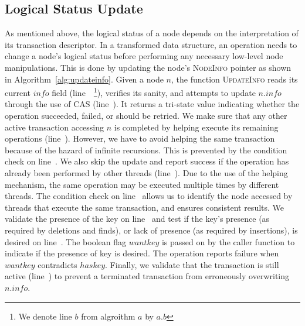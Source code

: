 \documentclass[]{sig-alternate-05-2015}
\begin{document}
\subsection{Logical Status Update}
\label{sec:logicalupdate}
As mentioned above, the logical status of a node depends on the interpretation of its transaction descriptor. 
In a transformed data structure, an operation needs to change a node's logical status before performing any necessary low-level node manipulations. 
This is done by updating the node's \textsc{NodeInfo} pointer as shown in Algorithm~\ref{alg:updateinfo}. 
Given a node $n$, the function \textsc{UpdateInfo} reads its current $info$ field (line~~\footnote{We denote line $b$ from algroithm $a$ by $a.b$}), verifies its sanity, and attempts to update $n.info$ through the use of CAS (line~).
It returns a tri-state value indicating whether the operation succeeded, failed, or should be retried.
We make sure that any other active transaction accessing $n$ is completed by helping execute its remaining operations (line~).
However, we have to avoid helping the same transaction because of the hazard of infinite recursions.
This is prevented by the condition check on line~.
We also skip the update and report success if the operation has already been performed by other threads (line~).
Due to the use of the helping mechanism, the same operation may be executed multiple times by different threads.
The condition check on line~ allows us to identify the node accessed by threads that execute the same transaction, and ensures consistent results.
We validate the presence of the key on line~ and test if the key's presence (as required by deletions and finds), or lack of presence (as required by insertions), is desired on line~. The boolean flag $wantkey$ is passed on by the caller function to indicate if the presence of key is desired.
The operation reports failure when $wantkey$ contradicts $haskey$.
Finally, we validate that the transaction is still active (line~) to prevent a terminated transaction from erroneously overwriting $n.info$.
\end{document}
